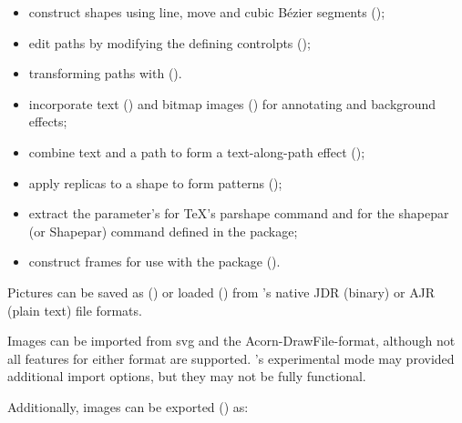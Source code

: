 \begin{itemize}
  \item construct shapes using line, move and cubic Bézier segments
();

  \item edit paths by modifying the defining \glspl{controlpt}
  ();

  \item transforming paths with  ().

  \item incorporate text () and 
  bitmap images ()
  for annotating and background effects;

  \item combine text and a path to form a text-along-path
  effect ();

  \item apply replicas to a shape to form patterns
  ();

  \item extract the parameter's for \TeX's \gls{parshape} command and for 
  the \gls{shapepar} (or \gls{Shapepar}) command defined in the
   package;

  \item construct frames for use with the  package
  ().
\end{itemize}

Pictures can be saved as () or loaded
() from \FlowframTk's native \gls{JDR}
(binary) or \gls{AJR} (plain text) file formats.

Images can be imported from \gls{svg} and the
\gls{Acorn-DrawFile-format}, although not all features for either
format are supported.  \FlowframTk's experimental mode may provided
additional import options, but they may not be fully functional.

Additionally, images can be exported () as:

